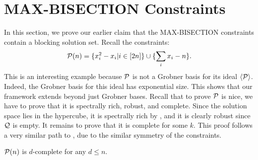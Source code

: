 \section{MAX-BISECTION Constraints}\label{sec:balance}
In this section, we prove our earlier claim that the MAX-BISECTION constraints contain a blocking solution set. Recall the constraints:
\[\mathcal P(n) = \{x_i^2 - x_i | i \in [2n]\} \cup \{\sum_i x_i - n\}.\]
This is an interesting example because $\mathcal P$ is not a Grobner basis for its ideal $\langle \mathcal P \rangle$. Indeed, the Grobner basis for this ideal has exponential size. This shows that our framework extends beyond just Grobner bases. Recall that to prove $\mathcal P$ is nice, we have to prove that it is spectrally rich, robust, and complete. Since the solution space lies in the hypercube, it is spectrally rich by , and it is clearly robust since $\mathcal Q$ is empty. It remains to prove that it is complete for some $k$. This proof follows a very similar path to \cite{}, due to the similar symmetry of the constraints. 
\begin{lemma}
$\mathcal P(n)$ is $d$-complete for any $d \leq n$.
\end{lemma}
